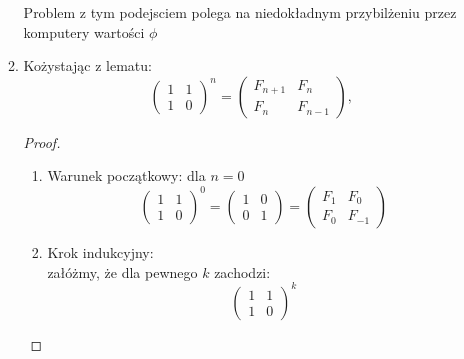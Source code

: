 \documentclass[11pt,a4paper]{article}
\begin{document}
\begin{itemize}
\begin{enumerate}
\[                \]
                Problem z tym podejsciem polega na niedokładnym przybilżeniu przez komputery wartości $\phi$
            \item Kożystając z lematu:
                \[
                    \begin{pmatrix}
                        1 & 1 \\
                        1 & 0
                    \end{pmatrix}^n
                    =
                    \begin{pmatrix}
                        F_{n+1} & F_n \\
                        F_n & F_{n-1}
                    \end{pmatrix},
                \]
                \begin{proof}
                    \begin{enumerate}
                        \item Warunek początkowy: dla $n = 0$
                            \[
                                \begin{pmatrix}
                                    1 & 1 \\
                                    1 & 0
                                \end{pmatrix}^0
                                =
                                \begin{pmatrix}
                                    1 & 0 \\
                                    0 & 1
                                \end{pmatrix}
                                =
                                \begin{pmatrix}
                                    F_1 & F_0 \\
                                    F_0 & F_{-1}
                                \end{pmatrix}
                            \]
                        \item Krok indukcyjny:\\
                            załóżmy, że dla pewnego $k$ zachodzi:
                            \[
                                \begin{pmatrix}
                                    1 & 1 \\
                                    1 & 0
                                \end{pmatrix}^k
\]
\end{enumerate}
\end{proof}
\end{enumerate}
\end{itemize}
\end{document}
